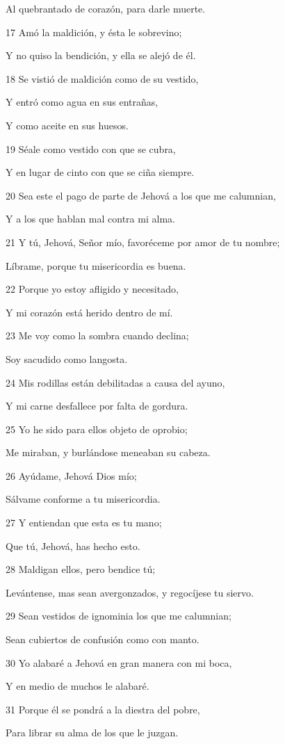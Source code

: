 \par Al quebrantado de corazón, para darle muerte.
\par 17 Amó la maldición, y ésta le sobrevino;
\par Y no quiso la bendición, y ella se alejó de él.
\par 18 Se vistió de maldición como de su vestido,
\par Y entró como agua en sus entrañas,
\par Y como aceite en sus huesos.
\par 19 Séale como vestido con que se cubra,
\par Y en lugar de cinto con que se ciña siempre.
\par 20 Sea este el pago de parte de Jehová a los que me calumnian,
\par Y a los que hablan mal contra mi alma.
\par 21 Y tú, Jehová, Señor mío, favoréceme por amor de tu nombre;
\par Líbrame, porque tu misericordia es buena.
\par 22 Porque yo estoy afligido y necesitado,
\par Y mi corazón está herido dentro de mí.
\par 23 Me voy como la sombra cuando declina;
\par Soy sacudido como langosta.
\par 24 Mis rodillas están debilitadas a causa del ayuno,
\par Y mi carne desfallece por falta de gordura.
\par 25 Yo he sido para ellos objeto de oprobio;
\par Me miraban, y burlándose meneaban su cabeza.
\par 26 Ayúdame, Jehová Dios mío;
\par Sálvame conforme a tu misericordia.
\par 27 Y entiendan que esta es tu mano;
\par Que tú, Jehová, has hecho esto.
\par 28 Maldigan ellos, pero bendice tú;
\par Levántense, mas sean avergonzados, y regocíjese tu siervo.
\par 29 Sean vestidos de ignominia los que me calumnian;
\par Sean cubiertos de confusión como con manto.
\par 30 Yo alabaré a Jehová en gran manera con mi boca,
\par Y en medio de muchos le alabaré.
\par 31 Porque él se pondrá a la diestra del pobre,
\par Para librar su alma de los que le juzgan.

